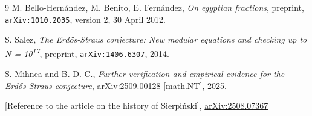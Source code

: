 \documentclass[12pt]{article}
\begin{document}
\begin{thebibliography}{9}
M. Bello-Hernández, M. Benito, E. Fernández, \textit{On egyptian fractions}, preprint, \texttt{arXiv:1010.2035}, version 2, 30 April 2012.

S. Salez, \textit{The Erdős-Straus conjecture: New modular equations and checking up to N = 10\textsuperscript{17}}, preprint, \texttt{arXiv:1406.6307}, 2014.

S. Mihnea and B. D. C., \textit{Further verification and empirical evidence for the Erdős-Straus conjecture}, arXiv:2509.00128 [math.NT], 2025.

 [Reference to the article on the history of Sierpiński], \href{https://arxiv.org/html/2508.07367v1}{arXiv:2508.07367}

\end{thebibliography}
\end{document}
